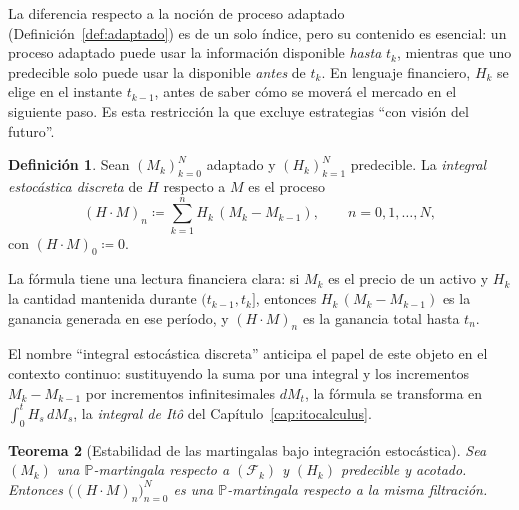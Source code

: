 \documentclass[11pt,a4paper,oneside]{report}
\theoremstyle{plain}
\newtheorem{teorema}{Teorema}[chapter]
\theoremstyle{definition}
\newtheorem{definicion}[teorema]{Definición}
\theoremstyle{remark}
\newcommand{\PP}{\mathbb{P}}
\newcommand{\F}{\mathcal{F}}
\newcommand{\1}{\mathbf{1}}
\newcommand{\eqdef}{\coloneqq}
\begin{document}
La diferencia respecto a la noción de proceso adaptado
(Definición~\ref{def:adaptado}) es de un solo índice, pero su contenido
es esencial: un proceso adaptado puede usar la información disponible
\emph{hasta} $t_k$, mientras que uno predecible solo puede usar la
disponible \emph{antes} de $t_k$. En lenguaje financiero, $H_k$ se
elige en el instante $t_{k-1}$, antes de saber cómo se moverá el
mercado en el siguiente paso. Es esta restricción la que excluye
estrategias ``con visión del futuro''.

\medskip

\begin{definicion}
\label{def:integral_discreta}
Sean $(M_k)_{k=0}^{N}$ adaptado y $(H_k)_{k=1}^{N}$ predecible. La
\emph{integral estocástica discreta} de $H$ respecto a $M$ es el
proceso
\begin{equation}\label{eq:integral_discreta}
  (H \cdot M)_n \eqdef \sum_{k=1}^{n} H_k\, (M_k - M_{k-1}),
  \qquad n = 0, 1, \ldots, N,
\end{equation}
con $(H \cdot M)_0 \eqdef 0$.
\end{definicion}

La fórmula tiene una lectura financiera clara: si $M_k$ es el
precio de un activo y $H_k$ la cantidad mantenida durante $(t_{k-1},
t_k]$, entonces $H_k\, (M_k - M_{k-1})$ es la ganancia generada en ese
período, y $(H \cdot M)_n$ es la ganancia total hasta $t_n$.

El nombre ``integral estocástica discreta'' anticipa el papel de este
objeto en el contexto continuo: sustituyendo la suma por una integral y
los incrementos $M_k - M_{k-1}$ por incrementos infinitesimales $dM_t$,
la fórmula se transforma en $\int_0^t H_s\, dM_s$, la
\emph{integral de Itô} del Capítulo~\ref{cap:itocalculus}.

\medskip

\begin{teorema}[Estabilidad de las martingalas bajo integración estocástica]
\label{teo:integral_preserva_martingala}
Sea $(M_k)$ una $\PP$-martingala respecto a $(\F_k)$ y $(H_k)$
predecible y acotado. Entonces $\bigl((H \cdot M)_n\bigr)_{n=0}^{N}$ es
una $\PP$-martingala respecto a la misma filtración.
\end{teorema}
\end{document}
